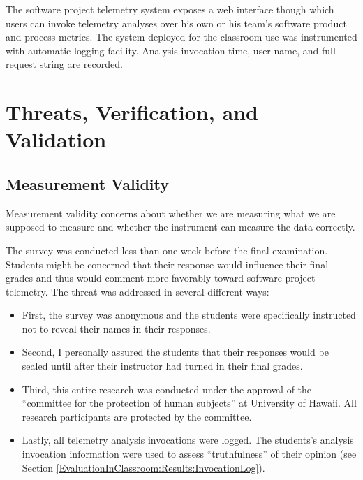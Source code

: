 The software project telemetry system exposes a web interface though which users can invoke telemetry analyses over his own or his team's software product and process metrics. The system deployed for the classroom use was instrumented with automatic logging facility. Analysis invocation time, user name, and full request string are recorded.  




\section{Threats, Verification, and Validation} \label{EvaluationInClassroom:Threats}


\subsection{Measurement Validity}
	
Measurement validity concerns about whether we are measuring what we are supposed to measure and whether the instrument can measure the data correctly. 

The survey was conducted less than one week before the final examination. Students might be concerned that their response would influence their final grades and thus would comment more favorably toward software project telemetry. The threat was addressed in several different ways:

\begin{itemize}
	\item First, the survey was anonymous and the students were specifically instructed not to reveal their names in their responses.
	
	\item Second, I personally assured the students that their responses would be sealed until after their instructor had turned in their final grades.
	
	\item Third, this entire research was conducted under the approval of the ``committee for the protection of human subjects'' at University of Hawaii. All research participants are protected by the committee.
	
	\item Lastly, all telemetry analysis invocations were logged. The students's analysis invocation information were used to assess ``truthfulness'' of their opinion (see Section \ref{EvaluationInClassroom:Results:InvocationLog}).
	
\end{itemize}



